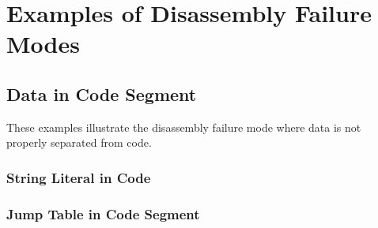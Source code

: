 

\chapter{Examples of Disassembly Failure Modes}
\label{app:examples_of_disassembly_failure_modes}

\section{Data in Code Segment}

These examples illustrate the disassembly failure mode where data is not properly separated from code.



\subsection{String Literal in Code}






\subsection{Jump Table in Code Segment}




